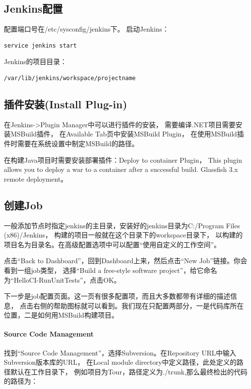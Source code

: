 \documentclass{book}
\begin{document}
\subsection{Jenkins配置}

配置端口号在/etc/sysconfig/jenkins下。
启动Jenkins：

\begin{lstlisting}[language=Bash]
service jenkins start
\end{lstlisting}

Jenkins的项目目录：

\begin{lstlisting}
/var/lib/jenkins/workspace/projectname
\end{lstlisting}

\subsection{插件安装(Install Plug-in)}

在Jenkins->Plugin Manager中可以进行插件的安装，
需要编译.NET项目需要安装MSBuild插件，
在Available Tab页中安装MSBuild Plugin，
在使用MSBuild插件时需要在系统设置中制定MSBuild的路径。

在构建Java项目时需要安装部署插件：Deploy to container Plugin，
This plugin allows you to deploy a war to a container after a successful build. 
Glassfish 3.x remote deployment。

\subsection{创建Job}

一般添加节点时指定jenkins的主目录，安装好的jenkins目录为C:/Program Files (x86)/Jenkins，
构建的项目一般就在这个目录下的workspace目录下，
以构建的项目名为目录名。在高级配置选项中可以配置“使用自定义的工作空间”。

点击“Back to Dashboard”，回到Dashboard上来，然后点击“New Job”链接。你会看到一组job类型，
选择“Build a free-style software project”，给它命名为“HelloCI-RunUnitTests”，点击OK。

下一步是job配置页面。这一页有很多配置项，而且大多数都带有详细的描述信息，
点击右侧的帮助图标就可以看到。我们现在只配置两部分，一是代码库所在位置，二是如何用MSBuild构建项目。

\paragraph{Source Code Management}

找到“Source Code Management”，选择Subversion。在Repository URL中输入Subversion版本库的URL，
在Local module directory中定义路径，此处定义的路径默认在工作目录下，
例如项目为Tour，路径定义为./trunk,那么最终检出的代码的路径为：
\end{document}
